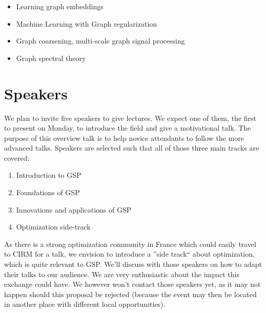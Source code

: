 \documentclass[a4paper]{scrartcl}
\begin{document}
\begin{itemize}
	\item Learning graph embeddings \cite{von2008consistency,zhou2006learning,belkin2003laplacian}
	\item Machine Learning with Graph regularization \cite{smola,belkin2005towards,zhou2004regularization,zhou2005learning,belkin2006manifold}
	\item Graph coarsening, multi-scale graph signal processing \cite{spielman2011graph,shuman2016multiscale,liu_coarsening,lafon_coarse,jansen}
	\item Graph spectral theory \cite{chung1997spectral,belkin2007convergence,shuman2015vertex,sandryhaila2014discrete,Nakatsukasa2013mysteries,brooks,dekel}
\end{itemize}

\section{Speakers}

We plan to invite five speakers to give lectures. We expect one of them, the
first to present on Monday, to introduce the field and give a motivational talk.
The purpose of this overview talk is to help novice attendants to follow the
more advanced talks. Speakers are selected such that all of those three
main tracks are covered:

\begin{enumerate}
	\setlength{\itemsep}{0pt} \setlength{\parskip}{0pt}
	\item Introduction to GSP
	\item Foundations of GSP
	\item Innovations and applications of GSP
	\item Optimization side-track
\end{enumerate} 

As there is a strong optimization community in France which could easily travel
to CIRM for a talk, we envision to introduce a ''side track`` about
optimization, which is quite relevant to GSP. We'll discuss with those speakers
on how to adapt their talks to our audience. We are very enthusiastic about the
impact this exchange could have. We however won't contact those speakers yet, as
it may not happen should this proposal be rejected (because the event may then
be located in another place with different local opportunities).
\end{document}
